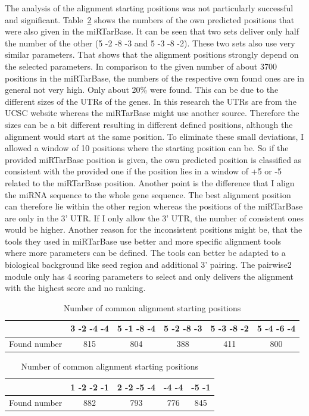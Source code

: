 \documentclass[12pt,  a4paper]{report}
\begin{document}
The analysis of the alignment starting positions was not particularly successful and significant. Table~\ref{tab:positions} shows the numbers of the own predicted positions that were also given in the miRTarBase. It can be seen that two sets deliver only half the number of the other (5 -2 -8 -3 and 5 -3 -8 -2). These two sets also use very similar parameters. That shows that the alignment positions strongly depend on the selected parameters. In comparison to the given number of about 3700 positions in the miRTarBase, the numbers of the respective own found ones are in general not very high. Only about 20\% were found. This can be due to the different sizes of the UTRs of the genes. In this research the UTRs are from the UCSC website whereas the miRTarBase might use another source. Therefore the sizes can be a bit different resulting in different defined positions, although the alignment would start at the same position. To eliminate these small deviations, I allowed a window of 10 positions where the starting position can be. So if the provided miRTarBase position is given, the own predicted position is classified as consistent with the provided one if the position lies in a window of +5 or -5 related to the miRTarBase position. Another point is the difference that I align the miRNA sequence to the whole gene sequence. The best alignment position can therefore lie within the other region whereas the positions of the miRTarBase are only in the 3' UTR. If I only allow the 3' UTR, the number of consistent ones would be higher. Another reason for the inconsistent positions might be, that the tools they used in miRTarBase use better and more specific alignment tools where more parameters can be defined. The tools can better be adapted to a biological background like seed region and additional 3' pairing. The pairwise2 module only has 4 scoring parameters to select and only delivers the alignment with the highest score and no ranking.  \\



\begin{table} [h]
\caption{Number of common alignment starting positions}
\vspace{0.3cm}
\begin{tabular}{c||c|c|c|c|c} 
& 3 -2 -4 -4 & 5 -1 -8 -4 & 5 -2 -8 -3 & 5 -3 -8 -2 & 5 -4 -6 -4  \\
\hline\hline
Found number & 815 & 804 & 388 & 411 & 800\\
\hline
\end{tabular}
\vspace{0.5cm}

\begin{tabular}{c||c|c|c|c}
& 1 -2 -2 -1 & 2 -2 -5 -4 & -4 -4 & -5 -1 \\
\hline\hline
Found number & 882 & 793 & 776 & 845  \\
\hline
\end{tabular}
\label{tab:positions}
\end{table}
\end{document}
